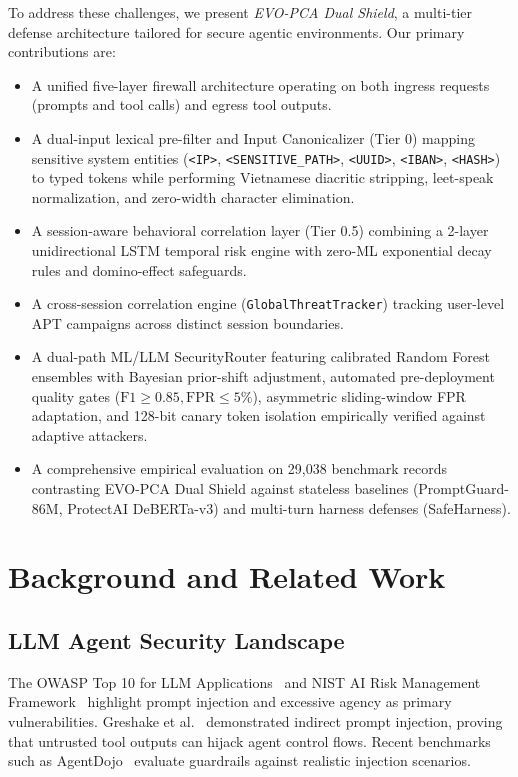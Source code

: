 \documentclass[conference]{IEEEtran}
\begin{document}
To address these challenges, we present \textit{EVO-PCA Dual Shield}, a multi-tier defense architecture tailored for secure agentic environments. Our primary contributions are:
\begin{itemize}
    \item A unified five-layer firewall architecture operating on both ingress requests (prompts and tool calls) and egress tool outputs.
    \item A dual-input lexical pre-filter and Input Canonicalizer (Tier 0) mapping sensitive system entities (\texttt{<IP>}, \texttt{<SENSITIVE\_PATH>}, \texttt{<UUID>}, \texttt{<IBAN>}, \texttt{<HASH>}) to typed tokens while performing Vietnamese diacritic stripping, leet-speak normalization, and zero-width character elimination.
    \item A session-aware behavioral correlation layer (Tier 0.5) combining a 2-layer unidirectional LSTM temporal risk engine with zero-ML exponential decay rules and domino-effect safeguards.
    \item A cross-session correlation engine (\texttt{GlobalThreatTracker}) tracking user-level APT campaigns across distinct session boundaries.
    \item A dual-path ML/LLM SecurityRouter featuring calibrated Random Forest ensembles with Bayesian prior-shift adjustment, automated pre-deployment quality gates ($\text{F1} \ge 0.85, \text{FPR} \le 5\%$), asymmetric sliding-window FPR adaptation, and 128-bit canary token isolation empirically verified against adaptive attackers.
    \item A comprehensive empirical evaluation on 29,038 benchmark records contrasting EVO-PCA Dual Shield against stateless baselines (PromptGuard-86M, ProtectAI DeBERTa-v3) and multi-turn harness defenses (SafeHarness).
\end{itemize}

\section{Background and Related Work}
\subsection{LLM Agent Security Landscape}
The OWASP Top 10 for LLM Applications~\cite{owasp2023} and NIST AI Risk Management Framework~\cite{nist2023} highlight prompt injection and excessive agency as primary vulnerabilities. Greshake et al.~\cite{greshake2023not} demonstrated indirect prompt injection, proving that untrusted tool outputs can hijack agent control flows. Recent benchmarks such as AgentDojo~\cite{agentdojo2024} evaluate guardrails against realistic injection scenarios.
\end{document}
